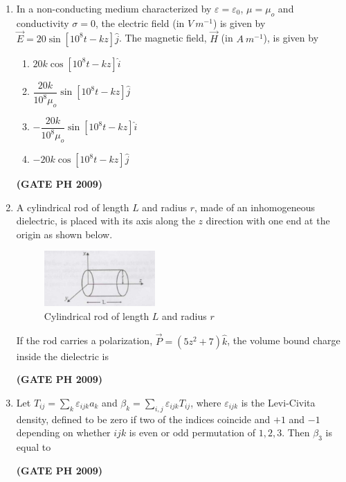 \documentclass[14pt, a4paper]{extarticle}
\renewcommand{\vec}[1]{\overrightarrow{#1}}
\begin{document}
\begin{enumerate}[label=\textbf{Q. \arabic*}, start=21]
\item In a non-conducting medium characterized by $\varepsilon = \varepsilon_0$, $\mu = \mu_o$ and conductivity $\sigma = 0$, the electric field (in $V~m^{-1}$) is given by $\vec{E} = 20\sin[10^8 t - kz] \hat{j}$. The magnetic field, $\vec{H}$ (in $A~m^{-1}$), is given by
\begin{enumerate}
\item $20k \cos[10^8 t - kz] \hat{i}$
\item $\dfrac{20k}{10^8 \mu_o}\sin[10^8 t - kz] \hat{j}$
\item $-\dfrac{20k}{10^8 \mu_o}\sin[10^8 t - kz] \hat{i}$
\item $-20k \cos[10^8 t - kz] \hat{j}$
\end{enumerate}
\hfill \textbf{(GATE PH 2009)}

\item A cylindrical rod of length $L$ and radius $r$, made of an inhomogeneous dielectric, is placed with its axis along the $z$ direction with one end at the origin as shown below.
\begin{figure}[H]
\centering
\includegraphics[width=0.4\textwidth]{figs/Q25fig.png}
\caption{Cylindrical rod of length $L$ and radius $r$ }
\label{fig:q25}
\end{figure}
If the rod carries a polarization, $\vec{P} = (5z^2 + 7)\hat{k}$, the volume bound charge inside the dielectric is
\begin{enumerate}
\end{enumerate}
\hfill \textbf{(GATE PH 2009)}

\item Let $T_{ij} = \sum_k \varepsilon_{ijk} a_k$ and $\beta_k = \sum_{i,j} \varepsilon_{ijk} T_{ij}$, where $\varepsilon_{ijk}$ is the Levi-Civita density, defined to be zero if two of the indices coincide and $+1$ and $-1$ depending on whether $ijk$ is even or odd permutation of $1,2,3$. Then $\beta_3$ is equal to
\begin{enumerate}
\end{enumerate}
\hfill \textbf{(GATE PH 2009)}


\end{enumerate}
\end{document}
